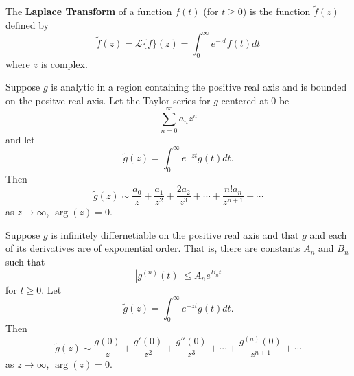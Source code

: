 \begin{defn}
The \textbf{Laplace Transform} of a function $f(t)$ (for $t\geq
0$) is the function $\widetilde{f}(z)$ defined by
\begin{equation}%
\widetilde{f}(z) = \mathcal{L}\{f\}(z) = \int^{\infty}_{0}e^{-zt}f(t)dt
\end{equation}
where $z$ is complex.
\end{defn}
\begin{prop}%
Suppose $g$ is analytic in a region containing the positive real
axis and is bounded on the positve real axis. Let the Taylor
series for $g$ centered at 0 be
\begin{equation}%
\sum^{\infty}_{n=0} a_{n}z^{n}
\end{equation}
and let
\begin{equation}%
\widetilde{g}(z) = \int^{\infty}_{0}e^{-zt}g(t)dt.
\end{equation}
Then
\begin{equation}%
\widetilde{g}(z)\sim \frac{a_0}{z}+\frac{a_1}{z^2}+\frac{2a_2}{z^3}+\cdots+\frac{n!a_n}{z^{n+1}}+\cdots
\end{equation}
as $z\to\infty$, $\operatorname{arg}(z)=0$.
\end{prop}
\begin{prop}%
Suppose $g$ is infinitely differnetiable on the positive real
axis and that $g$ and each of its derivatives are of exponential
order. That is, there are constants $A_n$ and $B_n$ such that
\begin{equation}%
|g^{(n)}(t)|\leq A_{n}e^{B_{n}t}
\end{equation}
for $t\geq0$. Let
\begin{equation}%
\widetilde{g}(z) = \int^{\infty}_{0}e^{-zt}g(t)dt.
\end{equation}
Then
\begin{equation}%
\widetilde{g}(z)\sim  \frac{g(0)}{z}+\frac{g'(0)}{z^2}+\frac{g''(0)}{z^3}+\cdots+\frac{g^{(n)}(0)}{z^{n+1}}+\cdots
\end{equation}
as $z\to\infty$, $\operatorname{arg}(z)=0$.
\end{prop}
